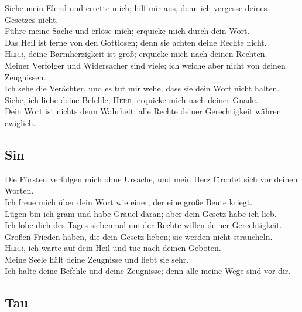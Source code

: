  Siehe mein Elend und errette mich; hilf mir aus, denn
ich vergesse deines Gesetzes nicht.\\
 Führe meine Sache und erlöse mich; erquicke mich durch
dein Wort.\\
 Das Heil ist ferne von den Gottlosen; denn sie achten
deine Rechte nicht.\\
 \textsc{Herr}, deine Barmherzigkeit ist groß; erquicke
mich nach deinen Rechten.\\
 Meiner Verfolger und Widersacher sind viele; ich weiche
aber nicht von deinen Zeugnissen.\\
 Ich sehe die Verächter, und es tut mir wehe, dass sie
dein Wort nicht halten.\\
 Siehe, ich liebe deine Befehle; \textsc{Herr}, erquicke
mich nach deiner Gnade.\\
 Dein Wort ist nichts denn Wahrheit; alle Rechte deiner
Gerechtigkeit währen ewiglich.

\hypertarget{sin}{%
\subsection{Sin}\label{sin}}

 Die Fürsten verfolgen mich ohne Ursache, und mein Herz
fürchtet sich vor deinen Worten.\\
 Ich freue mich über dein Wort wie einer, der eine große
Beute kriegt.\\
 Lügen bin ich gram und habe Gräuel daran; aber dein
Gesetz habe ich lieb.\\
 Ich lobe dich des Tages siebenmal um der Rechte willen
deiner Gerechtigkeit.\\
 Großen Frieden haben, die dein Gesetz lieben; sie
werden nicht straucheln.\\
 \textsc{Herr}, ich warte auf dein Heil und tue nach
deinen Geboten.\\
 Meine Seele hält deine Zeugnisse und liebt sie sehr.\\
 Ich halte deine Befehle und deine Zeugnisse; denn alle
meine Wege sind vor dir.

\hypertarget{tau}{%
\subsection{Tau}\label{tau}}


